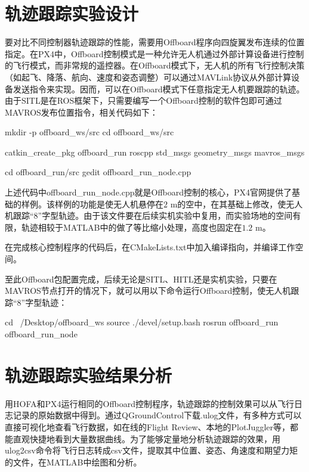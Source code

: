 \section{轨迹跟踪实验设计}
要对比不同控制器轨迹跟踪的性能，需要用Offboard程序向四旋翼发布连续的位置指定。在PX4中，Offboard控制模式是一种允许无人机通过外部计算设备进行控制的飞行模式，而非常规的遥控器。在Offboard模式下，无人机的所有飞行控制决策（如起飞、降落、航向、速度和姿态调整）可以通过MAVLink协议从外部计算设备发送指令来实现。因而，可以在Offboard模式下任意指定无人机要跟踪的轨迹。
由于SITL是在ROS框架下，只需要编写一个Offboard控制的软件包即可通过MAVROS发布位置指令，相关代码如下：
\begin{codeblock}[language=C]
  mkdir -p offboard_ws/src
  cd offboard_ws/src

  catkin_create_pkg offboard_run roscpp std_msgs geometry_msgs mavros_msgs
  
  cd offboard_run/src
  gedit offboard_run_node.cpp
\end{codeblock}
上述代码中offboard\_run\_node.cpp就是Offboard控制的核心，PX4官网提供了基础的样例\cite{px4}。该样例的功能是使无人机悬停在$2$ m的空中，在其基础上修改，使无人机跟踪“8”字型轨迹。由于该文件要在后续实机实验中复用，而实验场地的空间有限，轨迹相较于MATLAB中的做了等比缩小处理，高度也固定在$1.2$ m。

在完成核心控制程序的代码后，在CMakeLists.txt中加入编译指向，并编译工作空间。

至此Offboard包配置完成，后续无论是SITL、HITL还是实机实验，只要在MAVROS节点打开的情况下，就可以用以下命令运行Offboard控制，使无人机跟踪“8”字型轨迹：
\begin{codeblock}[language=C]
  cd ~/Desktop/offboard_ws
  source ./devel/setup.bash
  rosrun offboard_run offboard_run_node
\end{codeblock}


\section{轨迹跟踪实验结果分析}
用HOFA和PX4运行相同的Offboard控制程序，轨迹跟踪的控制效果可以从飞行日志记录的原始数据中得到。通过QGroundControl下载.ulog文件，有多种方式可以直接可视化地查看飞行数据，如在线的Flight Review、本地的PlotJuggler等，都能直观快捷地看到大量数据曲线。为了能够定量地分析轨迹跟踪的效果，用ulog2csv命令将飞行日志转成csv文件，提取其中位置、姿态、角速度和期望力矩的文件，在MATLAB中绘图和分析。

